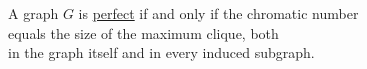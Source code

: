 \documentclass[preview]{standalone}
\begin{document}
\begin{center}
A graph $G$ is \underline{perfect} if and only if the chromatic number \\ equals the size of the maximum clique, both\\in the graph itself and in every induced subgraph.
\end{center}
\end{document}
